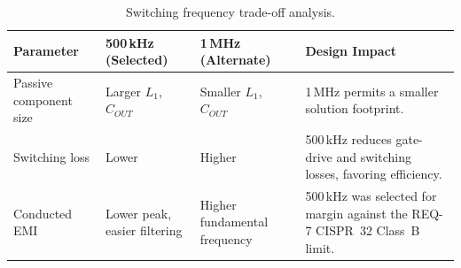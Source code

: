 \begin{table}[H]
\centering
\small
\begin{tabularx}{\linewidth}{@{}p{3.0cm} p{2.6cm} p{2.6cm} X@{}}
\toprule
\textbf{Parameter} & \textbf{500\,kHz (Selected)} & \textbf{1\,MHz (Alternate)} & \textbf{Design Impact} \\
\midrule
Passive component size & Larger $L_1$, $C_{OUT}$ & Smaller $L_1$, $C_{OUT}$ & 1\,MHz permits a smaller solution footprint. \\
Switching loss & Lower & Higher & 500\,kHz reduces gate-drive and switching losses, favoring efficiency. \\
Conducted EMI & Lower peak, easier filtering & Higher fundamental frequency & 500\,kHz was selected for margin against the REQ-7 CISPR~32 Class~B limit. \\
\bottomrule
\end{tabularx}
\caption{Switching frequency trade-off analysis.}
\label{tab:tradeoff-f}
\end{table}

